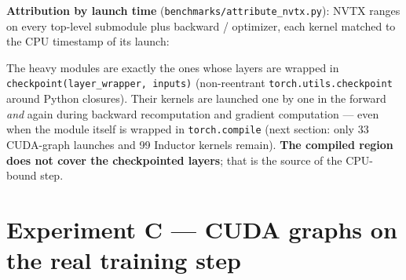 \documentclass[10pt]{article}
\begin{document}
\textbf{Attribution by launch time} (\texttt{benchmarks/attribute\_nvtx.py}): NVTX ranges on every top-level submodule plus backward / optimizer, each kernel matched to the CPU timestamp of its launch:


\begin{table}[H]\centering\small
{}
\end{table}

\begin{table}[H]\centering\small
{}
\end{table}

The heavy modules are exactly the ones whose layers are wrapped in \texttt{checkpoint(layer\_wrapper, inputs)} (non-reentrant \texttt{torch.utils.checkpoint} around Python closures). Their kernels are launched one by one in the forward \emph{and} again during backward recomputation and gradient computation --- even when the module itself is wrapped in \texttt{torch.compile} (next section: only 33 CUDA-graph launches and 99 Inductor kernels remain). \textbf{The compiled region does not cover the checkpointed layers}; that is the source of the CPU-bound step.


\section{Experiment C --- CUDA graphs on the real training step}
\end{document}
